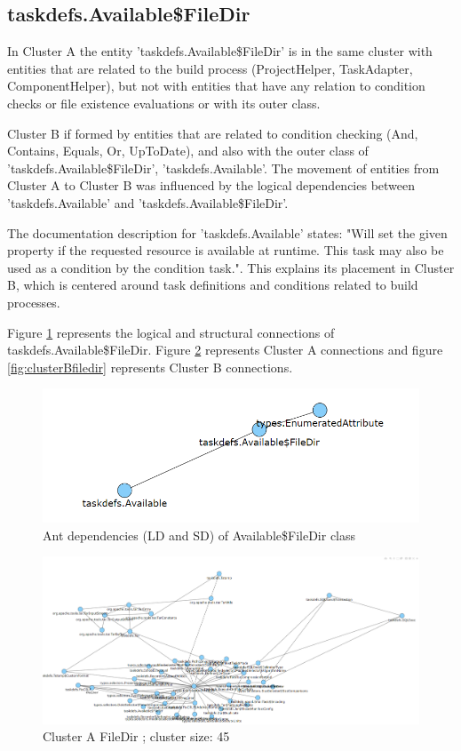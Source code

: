 \documentclass[conference]{IEEEtran}
\begin{document}
\subsection{taskdefs.Available\$FileDir}
In Cluster A the entity 'taskdefs.Available\$FileDir' is in the same cluster with entities that are related to the build process (ProjectHelper, TaskAdapter, ComponentHelper), but not with entities that have any relation to condition checks or file existence evaluations or with its outer class. 

Cluster B if formed by entities that are related to condition checking (And, Contains, Equals, Or, UpToDate), and also with the outer class of 'taskdefs.Available\$FileDir',  'taskdefs.Available'. The movement of entities from Cluster A to Cluster B was influenced by the logical dependencies between 'taskdefs.Available' and 'taskdefs.Available\$FileDir'.

The documentation description for 'taskdefs.Available' states: "Will set the given property if the requested resource is available at runtime. This task may also be used as a condition by the condition task."\cite{ant_concat}.
This explains its placement in Cluster B, which is centered around task definitions and conditions related to build processes.

Figure \ref{fig:dep_filedir} represents the logical and structural connections of taskdefs.Available\$FileDir. Figure \ref{fig:clusterAfiledir} represents Cluster A connections and figure \ref{fig:clusterBfiledir} represents Cluster B connections.


\begin{figure}
\centering
\includegraphics[width=\columnwidth]{dep_filedir.png}
\caption{Ant dependencies (LD and SD) of Available\$FileDir class}
\label{fig:dep_filedir}
\centering
\end{figure}

\begin{figure}
\centering
\includegraphics[width=\columnwidth]{cluster_filedirSD.PNG}
\caption{Cluster A FileDir ; cluster size: 45}
\label{fig:clusterAfiledir}
\centering
\end{figure}
\end{document}
